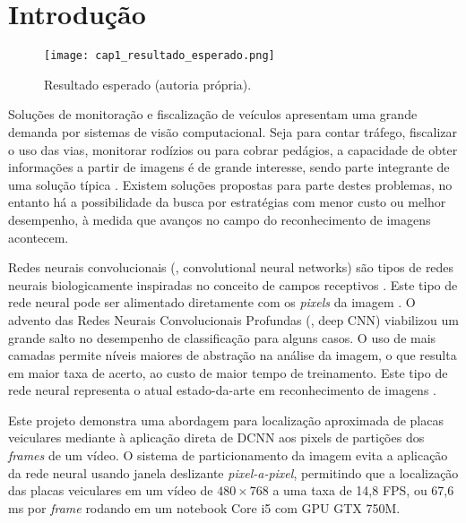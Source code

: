 
\chapter{Introdução}

\begin{figure}[!htb]
	\centering
	\texttt{[image: cap1\_resultado\_esperado.png]}
	\caption[Resultado esperado]{
		Resultado esperado (autoria própria).}
	\label{fig:cap1_resultado_esperado}
\end{figure}

Soluções de monitoração e fiscalização de veículos apresentam
uma grande demanda por sistemas de visão computacional. Seja
para contar tráfego, fiscalizar o uso das vias, monitorar
rodízios ou para cobrar pedágios, a capacidade de obter
informações a partir de imagens é de grande interesse, sendo parte integrante
de uma solução típica \cite{anagnostopoulos2008license}.  Existem
soluções propostas para parte destes problemas, no entanto há a
possibilidade da busca por estratégias com menor custo ou melhor
desempenho, à medida que avanços no campo do reconhecimento de
imagens acontecem.

Redes neurais convolucionais (, convolutional neural networks)
são tipos de redes neurais biologicamente inspiradas no conceito
de campos receptivos \cite{hubel1968receptive}. Este tipo de
rede neural pode ser alimentado
diretamente com os \emph{pixels} da imagem \cite{lecun1998gradient}. O
advento das Redes Neurais Convolucionais Profundas (, deep CNN)
viabilizou um grande salto no desempenho de classificação para alguns casos.
O uso de mais camadas permite níveis maiores de
abstração na análise da imagem, o que resulta em maior taxa de
acerto, ao custo de maior tempo de treinamento. Este tipo de rede
neural representa o atual estado-da-arte em reconhecimento de
imagens \cite{szegedy2015going}.

Este projeto demonstra uma abordagem para localização aproximada de placas
veiculares mediante à aplicação direta de DCNN aos pixels de partições dos
\emph{frames} de um vídeo. O sistema de particionamento da imagem evita a
aplicação da rede neural usando janela deslizante \emph{pixel-a-pixel},
permitindo que a localização das
placas veiculares em um vídeo de $480 \times 768$ a uma taxa de 14,8 FPS, ou
67,6 ms por \emph{frame} rodando em um notebook Core i5 com GPU GTX 750M.


